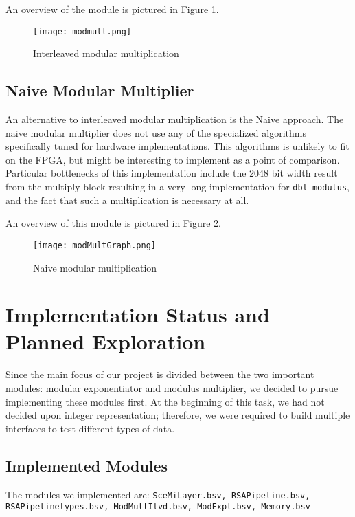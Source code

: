 \documentclass[12pt]{article}
\begin{document}
An overview of the module is pictured in Figure \ref{fig-inter}.

\begin{figure}
  \begin{centering}
    \texttt{[image: modmult.png]}
    \caption{Interleaved modular multiplication}
    \label{fig-inter}
  \end{centering}
\end{figure}

\subsection{Naive Modular Multiplier}
An alternative to interleaved modular multiplication is the Naive approach.
The naive modular multiplier does not use any of the specialized algorithms
specifically tuned for hardware implementations.
This algorithms is unlikely to fit on the FPGA,
but might be interesting to implement as a point of comparison.
Particular bottlenecks of this implementation include the 2048 bit width result from the multiply block
resulting in a very long implementation for {\tt dbl\_modulus},
and the fact that such a multiplication is necessary at all.

An overview of this module is pictured in Figure \ref{fig-naive}.

\begin{figure}
  \begin{centering}
    \texttt{[image: modMultGraph.png]}
    \caption{Naive modular multiplication}
    \label{fig-naive}
  \end{centering}
\end{figure}

\section{Implementation Status and Planned Exploration}
Since the main focus of our project is divided between the two important modules: modular exponentiator and modulus multiplier, we decided to pursue implementing these modules first.  At the beginning of this task, we had not decided upon integer representation; therefore, we were required to build multiple interfaces to test different types of data.  \\


\subsection{Implemented Modules}
The modules we implemented are:  {\tt SceMiLayer.bsv, RSAPipeline.bsv, RSAPipelinetypes.bsv,  ModMultIlvd.bsv, ModExpt.bsv, Memory.bsv}
\end{document}

